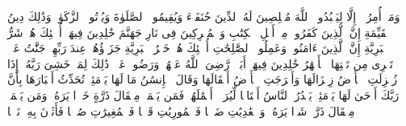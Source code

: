\stopbuffer
\startbuffer[\q:98:5]
وَمَاۤ أُمِرُوۤا۟ إِلَّا لِیَعۡبُدُوا۟ ٱللَّهَ مُخۡلِصِینَ لَهُ ٱلدِّینَ حُنَفَاۤءَ وَیُقِیمُوا۟ ٱلصَّلَوٰةَ وَیُؤۡتُوا۟ ٱلزَّكَوٰةَۚ وَذَٰلِكَ دِینُ ٱلۡقَیِّمَةِ%
\stopbuffer
\startbuffer[\q:98:6]
إِنَّ ٱلَّذِینَ كَفَرُوا۟ مِنۡ أَهۡلِ ٱلۡكِتَٰبِ وَٱلۡمُشۡرِكِینَ فِی نَارِ جَهَنَّمَ خَٰلِدِینَ فِیهَاۤۚ أُو۟لَٰۤئِكَ هُمۡ شَرُّ ٱلۡبَرِیَّةِ%
\stopbuffer
\startbuffer[\q:98:7]
إِنَّ ٱلَّذِینَ ءَامَنُوا۟ وَعَمِلُوا۟ ٱلصَّٰلِحَٰتِ أُو۟لَٰۤئِكَ هُمۡ خَیۡرُ ٱلۡبَرِیَّةِ%
\stopbuffer
\startbuffer[\q:98:8]
جَزَاۤؤُهُمۡ عِندَ رَبِّهِمۡ جَنَّٰتُ عَدۡنࣲ تَجۡرِی مِن تَحۡتِهَا ٱلۡأَنۡهَٰرُ خَٰلِدِینَ فِیهَاۤ أَبَدࣰاۖ رَّضِیَ ٱللَّهُ عَنۡهُمۡ وَرَضُوا۟ عَنۡهُۚ ذَٰلِكَ لِمَنۡ خَشِیَ رَبَّهُۥ%
\stopbuffer
\startbuffer[\q:99:1]
إِذَا زُلۡزِلَتِ ٱلۡأَرۡضُ زِلۡزَالَهَا%
\stopbuffer
\startbuffer[\q:99:2]
وَأَخۡرَجَتِ ٱلۡأَرۡضُ أَثۡقَالَهَا%
\stopbuffer
\startbuffer[\q:99:3]
وَقَالَ ٱلۡإِنسَٰنُ مَا لَهَا%
\stopbuffer
\startbuffer[\q:99:4]
یَوۡمَئِذࣲ تُحَدِّثُ أَخۡبَارَهَا%
\stopbuffer
\startbuffer[\q:99:5]
بِأَنَّ رَبَّكَ أَوۡحَىٰ لَهَا%
\stopbuffer
\startbuffer[\q:99:6]
یَوۡمَئِذࣲ یَصۡدُرُ ٱلنَّاسُ أَشۡتَاتࣰا لِّیُرَوۡا۟ أَعۡمَٰلَهُمۡ%
\stopbuffer
\startbuffer[\q:99:7]
فَمَن یَعۡمَلۡ مِثۡقَالَ ذَرَّةٍ خَیۡرࣰا یَرَهُۥ%
\stopbuffer
\startbuffer[\q:99:8]
وَمَن یَعۡمَلۡ مِثۡقَالَ ذَرَّةࣲ شَرࣰّا یَرَهُۥ%
\stopbuffer
\startbuffer[\q:100:1]
وَٱلۡعَٰدِیَٰتِ ضَبۡحࣰا%
\stopbuffer
\startbuffer[\q:100:2]
فَٱلۡمُورِیَٰتِ قَدۡحࣰا%
\stopbuffer
\startbuffer[\q:100:3]
فَٱلۡمُغِیرَٰتِ صُبۡحࣰا%
\stopbuffer
\startbuffer[\q:100:4]
فَأَثَرۡنَ بِهِۦ نَقۡعࣰا%
\stopbuffer
